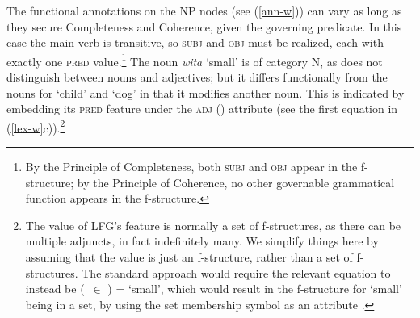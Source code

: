 \ex 
{\qquad{}}
    
\ex 
{\qquad{}} 
        
\zl


\ea
\label{fs-w} 
\z
The functional annotations on the NP nodes (see (\ref{ann-w})) can vary as long as they secure Completeness and Coherence, given the governing predicate.  In this case the main verb is transitive, so \textsc{subj} and \textsc{obj} must be realized, each with exactly one \textsc{pred} value.\footnote{By the Principle of Completeness, both \textsc{subj} and \textsc{obj} appear in the f-structure; by the Principle of Coherence, no other governable grammatical function appears in the f-structure.}  The noun \textit{wita} `small' is of category N, as  does not distinguish between nouns and adjectives; but it differs functionally from the nouns for `child' and `dog' in that it modifies another noun.  This is indicated by embedding its \textsc{pred} feature under the \textsc{adj} () attribute (see the first equation in (\ref{lex-w}c)).\footnote{The value of LFG's  feature is normally a set of f-structures, as there can be multiple adjuncts, in fact indefinitely many. We simplify things here by assuming that the value is just an f-structure, rather than a set of f-structures. The standard approach would require the relevant equation to instead be (\up {}\ $\in$ ) = `small', which would result in the f-structure for `small' being in a set, by using the set membership symbol as an attribute
  \citep[229--230]{dalrymple;ea19}.}     


